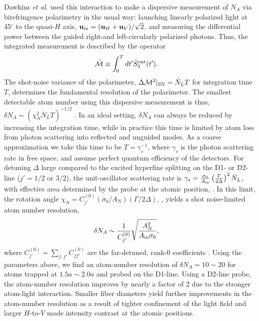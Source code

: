 \documentclass[aps,pra,twocolumn]{revtex4-1} %
\newcommand{\inp}{{\rm in}}
\newcommand{\shotnoise}{\Delta \mathcal{M}^2 |_{\rm SN}}
\newcommand{\chiN}{\chi_{N}}
\newcommand{\Abir}{A_N}
\newcommand{\comment}[1]{{\color{Maroon} #1}}
\begin{document}
Dawkins {\em et al.} \cite{dawkins_dispersive_2011} used this interaction to make a dispersive measurement of $N_A$ via birefringence polarimetry in the usual way: launching linearly polarized light at 45$^\circ$ to the quasi-$H$ axis, $\mbf{u}_\inp = (\mbf{u}_H + \mbf{u}_V )/\sqrt{2}$, and measuring the differential power between the guided right-and left-circularly polarized photons. 
Thus, the integrated measurement is described by the operator
\begin{align} \label{Eq::MeasOpAtomCounting}
		\hat{\mathcal{M}} & \equiv \int_0^T dt' \hat{S}^{\rm out}_3(t').
\end{align} 
The shot-noise variance of the polarimeter, $\shotnoise =  \dot{N}_L T$ for integration time $T$,  determines the fundamental resolution of the polarimeter.  
The smallest detectable atom number using this dispersive measurement is thus, $\delta N_A \sim ( \chiN^2 \dot{N}_L T)^{-1/2}$ \cite{smith_faraday_2003}.  
In an ideal setting, $\delta N_A$ can always be reduced by increasing the integration time, while in practice this time is limited by atom loss from photon scattering into reflected and unguided modes. 
As a coarse approximation we take this time to be $T=\gamma_s^{-1}$, where $\gamma_s$ is the photon scattering rate in free space, {\color{blue}and assume perfect quantum efficiency of the detectors.}  
For detuning $\Delta$ large compared to the excited hyperfine splitting on the \comment{D1- or D2-line ($j' = 1/2$ or $3/2$)}, the unit-oscillator scattering rate is 
$\gamma_s =\frac{\sigma_0}{A_{\rm in}}\left(\frac{\Gamma}{2 \Delta}\right)^2 \dot{N}_L $, 
with effective area determined by the probe at the atomic position, .  
In this limit, the rotation angle $\chiN = C^{(0)}_{j'} (\sigma_0/\Abir)(\Gamma/2\Delta)$, , yields a shot noise-limited atom number resolution, 
	\begin{align} \label{Eq::AtomNumberResolution}
		\delta N_A  &\sim \frac{1}{C^{(0)}_{j'}}\sqrt {\frac{\Abir^2}{A_{\rm in} \sigma_0}},
	\end{align}
where $ C^{(0)}_{j'}=\sum_{f,f'}C^{(0)}_{ff'}$ are the far-detuned, rank-$0$ coefficients \cite{deutsch_quantum_2010}.  
Using the parameters above, we find an atom-number resolution of $\delta N_A = 10\sim 20$ for atoms trapped at $ 1.5a\sim 2.0a $ and probed on the D1-line. 
Using a D2-line probe, the atom-number resolution improves by nearly a factor of 2 due to the stronger atom-light interaction. 
\comment{Smaller fiber diameters yield further improvements in the atom-number resolution as a result of tighter confinement of the light field and larger $H$-to-$V$ mode intensity contrast at the atomic positions. }
\end{document}
